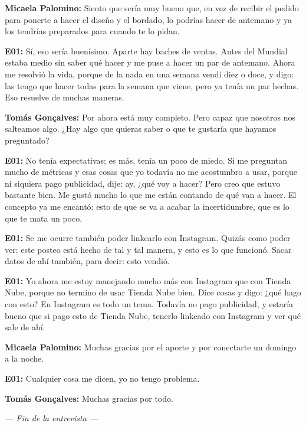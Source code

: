 \noindent\textbf{Micaela Palomino:} Siento que sería muy bueno que, en vez de recibir el pedido para ponerte a hacer el diseño y el bordado, lo podrías hacer de antemano y ya los tendrías preparados para cuando te lo pidan.

\noindent\textbf{E01:} Sí, eso sería buenísimo. Aparte hay baches de ventas. Antes del Mundial estaba medio sin saber qué hacer y me puse a hacer un par de antemano. Ahora me resolvió la vida, porque de la nada en una semana vendí diez o doce, y digo: las tengo que hacer todas para la semana que viene, pero ya tenía un par hechas. Eso resuelve de muchas maneras.

\noindent\textbf{Tomás Gonçalves:} Por ahora está muy completo. Pero capaz que nosotros nos salteamos algo. ¿Hay algo que quieras saber o que te gustaría que hayamos preguntado?

\noindent\textbf{E01:} No tenía expectativas; es más, tenía un poco de miedo. Si me preguntan mucho de métricas y esas cosas que yo todavía no me acostumbro a usar, porque ni siquiera pago publicidad, dije: ay, ¿qué voy a hacer? Pero creo que estuvo bastante bien. Me gustó mucho lo que me están contando de qué van a hacer. El concepto ya me encantó: esto de que se va a acabar la incertidumbre, que es lo que te mata un poco.

\noindent\textbf{E01:} Se me ocurre también poder linkearlo con Instagram. Quizás como poder ver: este posteo está hecho de tal y tal manera, y esto es lo que funcionó. Sacar datos de ahí también, para decir: esto vendió.

\noindent\textbf{E01:} Yo ahora me estoy manejando mucho más con Instagram que con Tienda Nube, porque no termino de usar Tienda Nube bien. Dice cosas y digo: ¿qué hago con esto? En Instagram es todo un tema. Todavía no pago publicidad, y estaría bueno que si pago esto de Tienda Nube, tenerlo linkeado con Instagram y ver qué sale de ahí.

\noindent\textbf{Micaela Palomino:} Muchas gracias por el aporte y por conectarte un domingo a la noche.

\noindent\textbf{E01:} Cualquier cosa me dicen, yo no tengo problema.

\noindent\textbf{Tomás Gonçalves:} Muchas gracias por todo.

\begin{center}\textit{--- Fin de la entrevista ---}\end{center}
